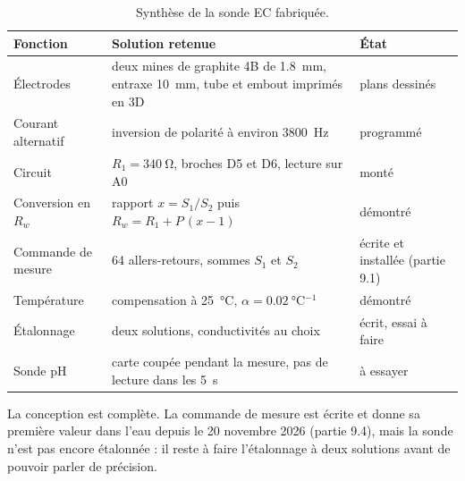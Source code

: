 \begin{table}[H]
\centering
\small
\begin{tabularx}{\textwidth}{|l|Y|l|}
\hline
\textbf{Fonction} & \textbf{Solution retenue} & \textbf{État} \\
\hline
Électrodes & deux mines de graphite 4B de \qty{1,8}{mm}, entraxe \qty{10}{mm}, tube et embout imprimés en 3D & plans dessinés \\
\hline
Courant alternatif & inversion de polarité à environ \qty{3800}{Hz} & programmé \\
\hline
Circuit & $R_1 = \qty{340}{\ohm}$, broches D5 et D6, lecture sur A0 & monté \\
\hline
Conversion en $R_w$ & rapport $x = S_1/S_2$ puis $R_w = R_1 + P\,(x-1)$ & démontré \\
\hline
Commande de mesure & 64 allers-retours, sommes $S_1$ et $S_2$ & écrite et installée (partie 9.1) \\
\hline
Température & compensation à \qty{25}{\celsius}, $\alpha = \qty{0,02}{\celsius^{-1}}$ & démontré \\
\hline
Étalonnage & deux solutions, conductivités au choix & écrit, essai à faire \\
\hline
Sonde pH & carte coupée pendant la mesure, pas de lecture dans les \qty{5}{s} & à essayer \\
\hline
\end{tabularx}
\caption{Synthèse de la sonde EC fabriquée.}
\end{table}

\begin{aretenir}
La conception est complète. La commande de mesure est écrite et donne sa première valeur dans l'eau depuis le 20 novembre 2026 (partie 9.4), mais la sonde n'est pas encore étalonnée : il reste à faire l'étalonnage à deux solutions avant de pouvoir parler de précision.
\end{aretenir}

